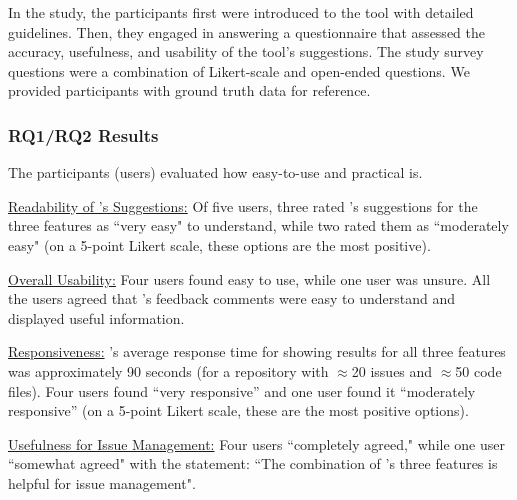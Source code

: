 
In the study, the participants first were introduced to the tool with detailed guidelines. Then, they engaged in answering a questionnaire that assessed the accuracy, usefulness, and usability of the tool's suggestions. The study survey questions were a combination of Likert-scale and open-ended questions. We provided participants with ground truth data for reference.

\subsubsection{RQ1/RQ2 Results}
The participants (\aka users) evaluated how easy-to-use and practical \toolname is.

\underline{Readability of \toolname's Suggestions:} Of five users, three rated \toolname's suggestions for the three features as ``very easy" to understand, while two rated them as ``moderately easy" (on a 5-point Likert scale, these options are the most positive).

\underline{{\toolname Overall Usability:}} Four users found \toolname easy to use, while one user was unsure. All the users agreed that \toolname's feedback comments were easy to understand and displayed useful information.

\underline{{\toolname Responsiveness:}} \toolname's average response time for showing results for all three features was approximately 90 seconds (for a repository with $\approx$20 issues and $\approx$50 code files). Four users found \toolname ``very responsive'' and one user found it ``moderately responsive'' (on a 5-point Likert scale, these are the most positive options).

\underline{{\toolname Usefulness for Issue Management:}} Four users ``completely agreed," while one user ``somewhat agreed" with the statement: ``The combination of \toolname's three features is helpful for issue management".


